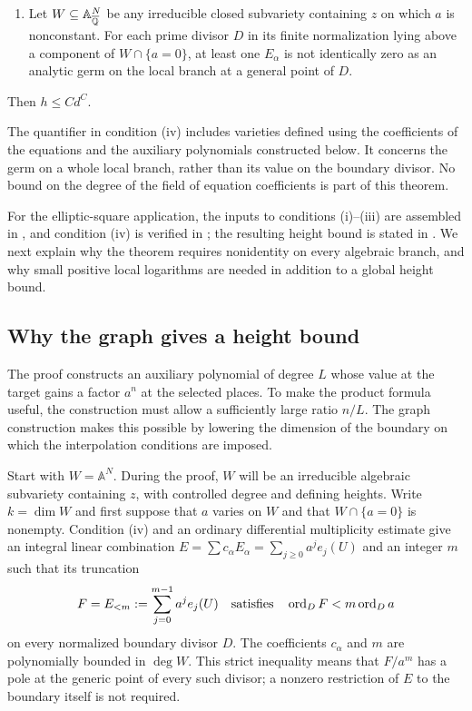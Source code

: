 \begin{theorem}
\begin{enumerate}[label=\textup{(\roman*)}]
polynomial combinations of degree at most $b$ of the coordinates and the
fixed germs evaluated at $a$, and possibly at $aR$, where $R$ is one of
the coordinates of $U$.  Their constant coefficients may depend on the
target.  The algebraic germs are regular functions on the specified local
curve charts.  Thus every expression is also a convergent complex analytic
germ near any finite point of $a=0$.
\item Let $W\subseteq\mathbb A^N_{\overline{\mathbb Q}}$ be any irreducible closed
subvariety containing $z$ on which $a$ is nonconstant.  For each prime
divisor $D$ in its finite normalization lying above a component of
$W\cap\{a=0\}$, at least one $E_\alpha$ is not identically zero as an
analytic germ on the local branch at a general point of $D$.
\end{enumerate}
Then $h\leq Cd^C$.
\end{theorem}

The quantifier in condition \textup{(iv)} includes varieties defined using
the coefficients of the equations and the auxiliary polynomials constructed
below.  It concerns the germ on a whole local branch, rather than its value
on the boundary divisor.  No bound on the degree of the field of equation
coefficients is part of this theorem.

For the elliptic-square application, the inputs to conditions
\textup{(i)--(iii)} are assembled in , and condition
\textup{(iv)} is verified in ; the resulting height
bound is stated in .  We next explain why the theorem
requires nonidentity on every algebraic branch, and why small positive
local logarithms are needed in addition to a global height bound.

\subsection{Why the graph gives a height bound}

The proof constructs an auxiliary polynomial of degree $L$ whose value
at the target gains a factor $a^n$ at the selected places.  To make the
product formula useful, the construction must allow a sufficiently
large ratio $n/L$.
The graph construction makes this possible by lowering the dimension
of the boundary on which the interpolation conditions are imposed.

Start with $W=\mathbb A^N$.  During the proof, $W$ will be an irreducible
algebraic subvariety containing $z$, with controlled degree and defining
heights.  Write $k=\dim W$ and first suppose that $a$ varies on $W$ and
that $W\cap\{a=0\}$ is nonempty.  Condition \textup{(iv)} and an ordinary
differential multiplicity estimate give an integral linear combination
$E=\sum c_\alpha E_\alpha=\sum_{j\geq0}a^je_j(U)$ and an integer $m$
such that its truncation
\[
 F=E_{<m}:=\sum_{j=0}^{m-1}a^je_j(U)
 \quad\text{satisfies}\quad
 \operatorname{ord}_D F<m\operatorname{ord}_D a
\]
on every normalized boundary divisor $D$.  The coefficients $c_\alpha$
and $m$ are polynomially bounded in $\deg W$.  This strict inequality
means that $F/a^m$ has a pole at the generic point of every such divisor;
a nonzero restriction of $E$ to the boundary itself is not required.

